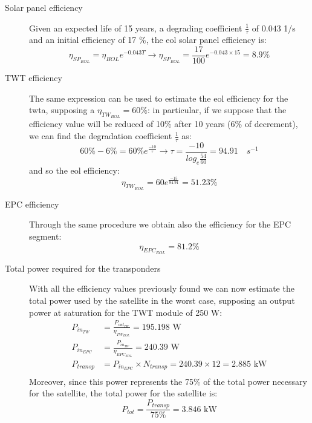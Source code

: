 \begin{description}
\item[Solar panel efficiency] Given an expected life of 15 years, a degrading coefficient $\frac{1}{\tau}$ of $0.043$ 1/s and an initial efficiency of 17 \%, the \gls{eol} solar panel efficiency is:
\begin{equation}
	\eta_{SP_{EOL}} = \eta_{BOL}e^{-0.043T} \rightarrow \eta_{SP_{EOL}} = \frac{17}{100}e^{-0.043\times 15} = 8.9 \%
\end{equation}
\item[TWT efficiency] The same expression can be used to estimate the \gls{eol} efficiency for the \gls{twta}, supposing a $\eta_{TW_{BOL}} = 60\%$: in particular, if we suppose that the efficiency value will be reduced of 10\% after 10 years (6\% of decrement)\cite{Miguel17}, we can find the degradation coefficient $\frac{1}{\tau}$ as:
\begin{equation}
60 \% - 6 \% =60 \% e^{\frac{-10}{\tau}} \rightarrow \tau = \frac{-10}{log_e\frac{54}{60}} = 94.91 \quad s^{-1}
\end{equation}
and so the \gls{eol} efficiency:
\begin{equation}
\eta_{TW_{EOL}} = 60e^{\frac{-15}{94.91}} = 51.23 \%
\end{equation}
\item[EPC efficiency] Through the same procedure we obtain also the efficiency for the EPC segment:
\begin{equation}
\eta_{EPC_{EOL}} = 81.2 \%
\end{equation}
\item[Total power required for the transponders] With all the efficiency values previously found we can now estimate the total power used by the satellite in the worst case, supposing an output power at saturation for the TWT module of 250 W:
\begin{align}
P_{in_{TW}} &= \frac{P_{out_{TW}}}{\eta_{TW_{EOL}}} = 195.198 \text{ W}\\
P_{in_{EPC}} &= \frac{P_{in_{TW}}}{\eta_{EPC_{EOL}}} = 240.39 \text{ W}\\
P_{transp} &= P_{in_{EPC}} \times N_{transp} = 240.39 \times 12 = 2.885 \text{ kW}\\
\end{align}
Moreover, since this power represents the 75\% of the total power necessary for the satellite, the total power for the satellite is:
\begin{equation}
P_{tot} = \frac{P_{transp}}{75\%} = 3.846 \text{ kW}
\end{equation}
\end{description}
